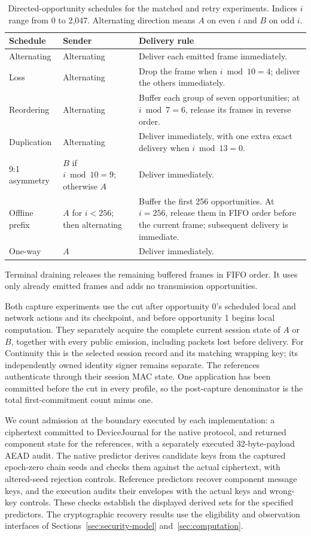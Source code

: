 \documentclass[pdflatex]{sn-jnl}
\theoremstyle{thmstyleone}
\theoremstyle{thmstylethree}
\theoremstyle{thmstyletwo}
\begin{document}
\begin{table}[tb]
\caption{Directed-opportunity schedules for the matched and retry
experiments. Indices $i$ range from 0 to 2,047. Alternating direction
means $A$ on even $i$ and $B$ on odd $i$.}
\label{tab:matched-schedule-rules}
\small
\begin{tabularx}{\textwidth}{@{}L{0.18\textwidth}L{0.18\textwidth}Y@{}}
\toprule
Schedule & Sender & Delivery rule \\
\midrule
Alternating & Alternating & Deliver each emitted frame immediately. \\
Loss & Alternating & Drop the frame when $i\bmod10=4$; deliver the others immediately. \\
Reordering & Alternating & Buffer each group of seven opportunities; at $i\bmod7=6$, release its frames in reverse order. \\
Duplication & Alternating & Deliver immediately, with one extra exact delivery when $i\bmod13=0$. \\
9:1 asymmetry & $B$ if $i\bmod10=9$; otherwise $A$ & Deliver immediately. \\
Offline prefix & $A$ for $i<256$; then alternating & Buffer the first 256 opportunities. At $i=256$, release them in FIFO order before the current frame; subsequent delivery is immediate. \\
One-way & $A$ & Deliver immediately. \\
\bottomrule
\end{tabularx}

\smallskip
\parbox{\textwidth}{\small Terminal draining releases the remaining
buffered frames in FIFO order. It uses only already emitted frames and
adds no transmission opportunities.}
\end{table}

Both capture experiments use the cut after opportunity 0's scheduled
local and network actions and its checkpoint, and before opportunity 1
begins local computation. They separately acquire the complete current session
state of $A$ or $B$, together with every public emission, including packets
lost before delivery. For Continuity this is the selected session record and
its matching wrapping key; its independently owned identity signer remains
separate. The references authenticate through their session MAC state.
One application has been committed before the cut in every profile, so the
post-capture denominator is the total first-commitment count minus one.

We count admission at the boundary executed by each implementation: a
ciphertext committed to DeviceJournal for the native protocol, and returned
component state for the references, with a separately executed
32-byte-payload AEAD audit. The native predictor derives candidate keys
from the captured epoch-zero chain seeds and checks them against the actual
ciphertext, with altered-seed rejection controls. Reference predictors
recover component message keys, and the execution audits their envelopes
with the actual keys and wrong-key controls. These checks establish the
displayed derived sets for the specified predictors. The cryptographic
recovery results use the eligibility and observation interfaces of
Sections~\ref{sec:security-model} and~\ref{sec:computation}.
\end{document}
